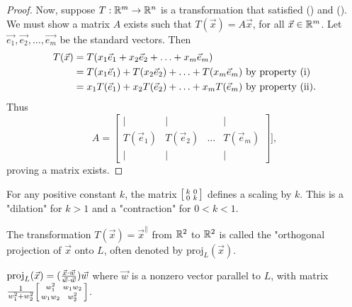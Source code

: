 \documentclass[a4paper,11pt]{article}
\begin{document}
\begin{outline}
\begin{proof}
      \backward
        Now, suppose \(T: \mathbb{R}^m \rightarrow \mathbb{R}^n\) is a transformation that satisfied
        () and (). We must show a matrix \(A\) exists such that 
        \(T(\vec{x}) = A\vec{x}\), for all \(\vec{x} \in \mathbb{R}^m\). Let \(\vec{e_1}, \vec{e_2}, 
        \ldots, \vec{e_m}\) be the standard vectors. Then
        \begin{align*}
          T(\vec{x}) &= T(x_1\vec{e}_1 + x_2\vec{e}_2 + \ldots + x_m\vec{e}_m)\\
                     &= T(x_1\vec{e}_1) + T(x_2\vec{e}_2) + \ldots + T(x_m\vec{e}_m) 
                        \text{ by property (\romannumeral 1)}\\
                     &= x_1T(\vec{e}_1) + x_2T(\vec{e}_2) + \ldots + x_mT(\vec{e}_m) 
                        \text{ by property (\romannumeral 2).}
        \end{align*}
        Thus 
        \[ A = \begin{bmatrix}
          \vert        & \vert        &        & \vert       \\
          T(\vec{e}_1) & T(\vec{e}_2) & \ldots & T(\vec{e}_m)\\
          \vert        & \vert        &        & \vert       \end{bmatrix}], 
        \] proving a matrix exists.
    \end{proof}
    
    For any positive constant \(k\), the matrix \(\begin{bsmallmatrix} k&0\\ 0&k \end{bsmallmatrix}\) defines
    a scaling by \(k\). This is a "dilation" for \(k > 1\) and a "contraction" for \(0 < k < 1\).
    
    The transformation \(T(\vec{x}) = \vec{x}^{\parallel}\) from \(\mathbb{R}^2\) to \(\mathbb{R}^2\)
    is called the "orthogonal projection of \(\vec{x}\) onto \(L\), often denoted by \(\text{proj}_{L}(\vec{x})\).
    
    \(\text{proj}_{L}(\vec{x}) = (\frac{\vec{x}\cdot\vec{w}}{\vec{w}\cdot\vec{w}})\vec{w}\) 
    where \(\vec{w}\) is a nonzero vector parallel to \(L\), with matrix \(\frac{1}{w_1^2 + w_2^2}
    \begin{bsmallmatrix} w_1^2&w_1w_2\\ w_1w_2&w_2^2 \end{bsmallmatrix}\).
    

\end{outline}
\end{document}
